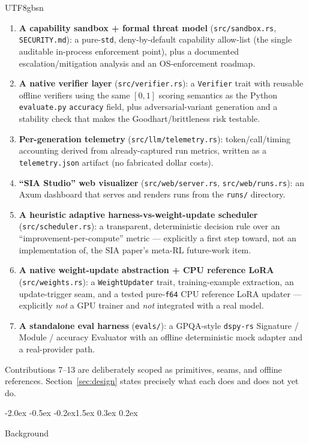 \documentclass{article}
\makeatletter
\renewcommand{\section}{\@startsection{section}{1}{\z@}%
  {-2.0ex \@plus -0.5ex \@minus -0.2ex}{1.5ex \@plus 0.3ex \@minus 0.2ex}%
  {\large\bfseries\raggedright\color{accent}}}
\makeatother
\begin{document}
\begin{CJK}{UTF8}{gbsn}
\begin{enumerate}
  answer-parsing semantics and wraps \texttt{rig-core}'s \texttt{Extractor} for the
  live path.
\item \textbf{A capability sandbox + formal threat model} (\texttt{src/sandbox.rs},
  \texttt{SECURITY.md}): a pure-\texttt{std}, deny-by-default capability allow-list
  (the single auditable in-process enforcement point), plus a documented
  escalation/mitigation analysis and an OS-enforcement roadmap.
\item \textbf{A native verifier layer} (\texttt{src/verifier.rs}): a
  \texttt{Verifier} trait with reusable offline verifiers using the same $[0,1]$
  scoring semantics as the Python \texttt{evaluate.py} \texttt{accuracy} field, plus
  adversarial-variant generation and a stability check that makes the
  Goodhart/brittleness risk testable.
\item \textbf{Per-generation telemetry} (\texttt{src/llm/telemetry.rs}):
  token/call/timing accounting derived from already-captured run metrics, written as
  a \texttt{telemetry.json} artifact (no fabricated dollar costs).
\item \textbf{``SIA Studio'' web visualizer} (\texttt{src/web/server.rs},
  \texttt{src/web/runs.rs}): an Axum dashboard that serves and renders runs from the
  \texttt{runs/} directory.
\item \textbf{A heuristic adaptive harness-vs-weight-update scheduler}
  (\texttt{src/scheduler.rs}): a transparent, deterministic decision rule over an
  ``improvement-per-compute'' metric --- explicitly a first step toward, not an
  implementation of, the SIA paper's meta-RL future-work item.
\item \textbf{A native weight-update abstraction + CPU reference LoRA}
  (\texttt{src/weights.rs}): a \texttt{WeightUpdater} trait, training-example
  extraction, an update-trigger seam, and a tested pure-\texttt{f64} CPU reference
  LoRA updater --- explicitly \emph{not} a GPU trainer and \emph{not} integrated with
  a real model.
\item \textbf{A standalone eval harness} (\texttt{evals/}): a GPQA-style
  \texttt{dspy-rs} Signature / Module / accuracy Evaluator with an offline
  deterministic mock adapter and a real-provider path.
\end{enumerate}

Contributions 7--13 are deliberately scoped as primitives, seams, and offline
references. Section~\ref{sec:design} states precisely what each does and does not yet
do.

\section{Background}


\end{CJK}
\end{document}
